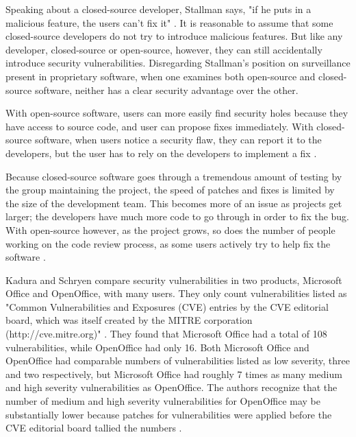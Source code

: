 Speaking about a closed-source developer, Stallman says, "if he puts in a
malicious feature, the users can't fix it" \citeyear[para. 36]{rms2011}.
It is reasonable to assume that some closed-source developers do not try
to introduce malicious features. But like any developer, closed-source or
open-source, however, they can still accidentally introduce security
vulnerabilities. Disregarding Stallman's position on surveillance present in
proprietary software, when one examines both open-source and closed-source
software, neither has a clear security advantage over the other.

With open-source software, users can more easily find security holes because
they have access to source code, and user can propose fixes immediately.
With closed-source software, when users notice a security flaw, they can report
it to the developers, but the user has to rely on the developers to implement a
fix \cite[para. 17]{kadura}.

Because closed-source software goes through a tremendous amount of testing
by the group maintaining the project, the speed of patches and fixes is limited
by the size of the development team. This becomes more of an issue as projects
get larger; the developers have much more code to go through in order to fix the
bug. With open-source however, as the project grows, so does the number of
people working on the code review process, as some users actively try to help
fix the software \cite[p. ~245]{boulanger}.

Kadura and Schryen compare security vulnerabilities in two products, Microsoft
Office and OpenOffice, with many users. They only count vulnerabilities listed
as "Common Vulnerabilities and Exposures (CVE) entries by the CVE editorial
board, which was itself created by the MITRE corporation (http://cve.mitre.org)"
\citeyear{kadura}. They found that Microsoft Office had a total of 108
vulnerabilities, while OpenOffice had only 16. Both Microsoft Office and
OpenOffice had comparable numbers of vulnerabilities listed as low severity,
three and two respectively, but Microsoft Office had roughly 7 times as many
medium and high severity vulnerabilities as OpenOffice. The authors recognize
that the number of medium and high severity vulnerabilities for OpenOffice may
be substantially lower because patches for vulnerabilities were applied before
the CVE editorial board tallied the numbers \cite{kadura}.
